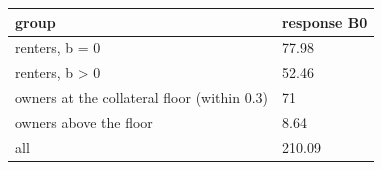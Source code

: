 \begingroup\small
\setlength{\tabcolsep}{3pt}
\renewcommand{\arraystretch}{1.04}
\begin{tabularx}{\linewidth}{XX}
\toprule
group & response B0 \\
\midrule
renters, b = 0 & 77.98 \\
renters, b \textgreater{} 0 & 52.46 \\
owners at the collateral floor (within 0.3) & 71 \\
owners above the floor & 8.64 \\
all & 210.09 \\
\bottomrule
\end{tabularx}
\endgroup
